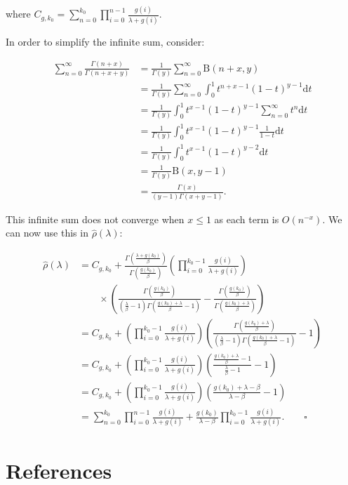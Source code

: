 \documentclass[
  sn-basic,
  10pt,
]{sn-jnl}
\theoremstyle{plain}
\theoremstyle{plain}
\theoremstyle{remark}
\begin{document}
where
\(C_{g,k_0} = \sum_{n=0}^{k_0}\prod_{i=0}^{n-1}\frac{g(i)}{\lambda+g(i)}\).

In order to simplify the infinite sum, consider:

\begin{align*}
\sum_{n=0}^\infty\frac{\Gamma(n+x)}{\Gamma(n+x+y)} &=\frac{1}{\Gamma(y)}\sum_{n=0}^\infty \text{B}(n+x,y)\\
&=\frac{1}{\Gamma(y)}\sum_{n=0}^\infty\int_0^1t^{n+x-1}(1-t)^{y-1}\text{d}t\\
&=\frac{1}{\Gamma(y)}\int_0^1 t^{x-1}(1-t)^{y-1}\sum_{n=0}^\infty t^n \text{d}t\\
&=\frac{1}{\Gamma(y)}\int_0^1 t^{x-1}(1-t)^{y-1}\frac{1}{1-t}\text{d}t\\
&=\frac{1}{\Gamma(y)}\int_0^1 t^{x-1}(1-t)^{y-2}\text{d}t\\
&=\frac{1}{\Gamma(y)}\text{B}(x,y-1)\\
&= \frac{\Gamma(x)}{(y-1)\Gamma(x+y-1)}.
\end{align*}

This infinite sum does not converge when \(x\le1\) as each term is
\(O(n^{-x})\). We can now use this in \(\hat\rho(\lambda)\):

\begin{align*}
\hat\rho(\lambda) &= C_{g,k_0} + \frac{\Gamma\left(\frac{\lambda+g(k_0)}{\beta}\right)}{\Gamma\left(\frac{g(k_0)}{\beta}\right)}\left(\prod_{i=0}^{k_0-1}\frac{g(i)}{\lambda+g(i)}\right)\\&\qquad \times\left(\frac{\Gamma\left(\frac{g(k_0)}{\beta}\right)}{\left(\frac{\lambda}{\beta}-1\right)\Gamma\left(\frac{g(k_0)+\lambda}{\beta}-1\right)}-\frac{\Gamma\left(\frac{g(k_0)}{\beta}\right)}{\Gamma\left(\frac{g(k_0)+\lambda}{\beta}\right)}\right)\\
&=C_{g,k_0} + \left(\prod_{i=0}^{k_0-1}\frac{g(i)}{\lambda+g(i)}\right)\left(\frac{\Gamma\left(\frac{g(k_0)+\lambda}{\beta}\right)}{\left(\frac{\lambda}{\beta}-1\right)\Gamma\left(\frac{g(k_0)+\lambda}{\beta}-1\right)}-1\right)\\
&=C_{g,k_0} + \left(\prod_{i=0}^{k_0-1}\frac{g(i)}{\lambda+g(i)}\right)\left(\frac{\frac{g(k_0)+\lambda}{\beta}-1}{\frac{\lambda}{\beta}-1}-1\right)\\
&=C_{g,k_0} + \left(\prod_{i=0}^{k_0-1}\frac{g(i)}{\lambda+g(i)}\right)\left(\frac{g(k_0)+\lambda-\beta}{\lambda-\beta}-1\right)\\&=\sum_{n=0}^{k_0}\prod_{i=0}^{n-1}\frac{g(i)}{\lambda+g(i)} + \frac{g(k_0)}{\lambda-\beta}\prod_{i=0}^{k_0-1}\frac{g(i)}{\lambda+g(i)}.\qquad  \square
\end{align*}

\newpage

\section*{References}\label{references}

\renewcommand{\bibsection}{}

\end{document}
